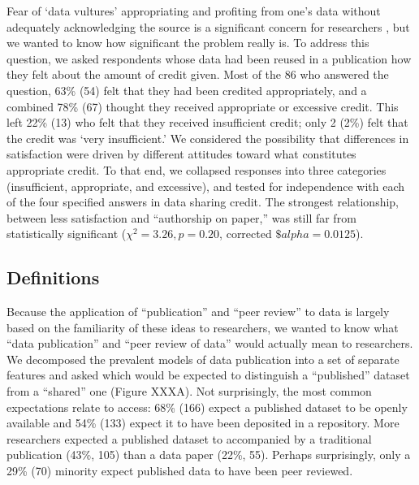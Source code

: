 \documentclass[10pt]{article}
\begin{document}
Fear of `data vultures' appropriating and profiting from one's data without adequately acknowledging the source is a significant concern for researchers \cite{kim_insitutional_2012}, but we wanted to know how significant the problem really is.
To address this question, we asked respondents whose data had been reused in a publication how they felt about the amount of credit given.
Most of the 86 who answered the question, 63\% (54) felt that they had been credited appropriately, and a combined 78\% (67) thought they received appropriate or excessive credit.
This left 22\% (13) who felt that they received insufficient credit; only 2 (2\%) felt that the credit was `very insufficient.'
We considered the possibility that differences in satisfaction were driven by different attitudes toward what constitutes appropriate credit.  
To that end, we collapsed responses into three categories (insufficient, appropriate, and excessive), and tested for independence with each of the four specified answers in data sharing credit.
The strongest relationship, between less satisfaction and ``authorship on paper,'' was still far from statistically significant ($\chi^{2}= 3.26, p= 0.20$, corrected $\$alpha= 0.0125$).

\subsection*{Definitions}

Because the application of ``publication'' and ``peer review'' to data is largely based on the familiarity of these ideas to researchers, we wanted to know what ``data publication'' and ``peer review of data'' would actually mean to researchers.
We decomposed the prevalent models of data publication into a set of separate features and asked which would be expected to distinguish a ``published'' dataset from a ``shared'' one (Figure XXXA).
Not surprisingly, the most common expectations relate to access: 68\% (166) expect a published dataset to be openly available and 54\% (133) expect it to have been deposited in a repository.
More researchers expected a published dataset to accompanied by a traditional publication (43\%, 105) than a data paper (22\%, 55).
Perhaps surprisingly, only a 29\% (70) minority expect published data to have been peer reviewed.
\end{document}
